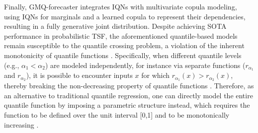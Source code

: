 \documentclass[a4paper,oneside,bibliography=totoc]{scrbook}
\begin{document}
Finally, GMQ-forecaster \cite{wen_deep_2019} integrates IQNs with multivariate copula modeling, using IQNs for marginals and a learned copula to represent their dependencies, resulting in a fully generative joint distribution.
Despite achieving SOTA performance in probabilistic TSF, the aforementioned quantile-based models remain susceptible to the quantile crossing problem, a violation of the inherent monotonicity of quantile functions \cite{park_learning_2022}. 
Specifically, when different quantile levels (e.g., $\alpha_1< \alpha_2$) are modeled independently, for instance via separate functions ($r_{\alpha_1}$ and $r_{\alpha_2}$), it is possible to encounter inputs $x$ for which $r_{\alpha_1}(x)>r_{\alpha_2}(x)$, thereby breaking the non-decreasing property of quantile functions \cite{gasthaus_probabilistic_2019}.
Therefore, as an alternative to traditional quantile regression, one can directly model the entire quantile function by imposing a parametric structure instead, which requires the function to be defined over the unit interval [0,1] and to be monotonically increasing \cite{benidis_deep_2022}. 
\end{document}

